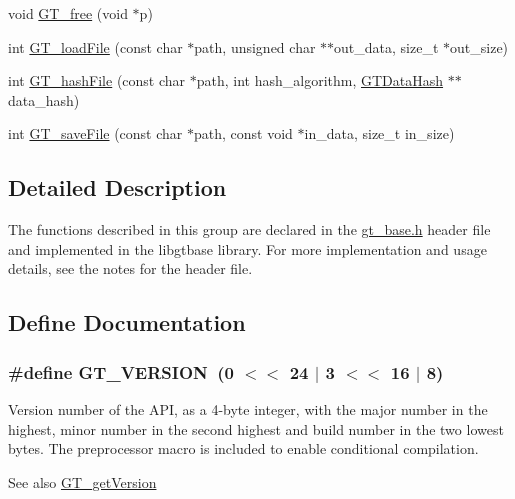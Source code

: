 \begin{DoxyCompactItemize}
\item 
void \hyperlink{group__common_ga0446e9253011a921665126e9f37016a1}{GT\_\-free} (void $\ast$p)
\item 
int \hyperlink{group__common_ga409dea240b5b501fa097de7c06705203}{GT\_\-loadFile} (const char $\ast$path, unsigned char $\ast$$\ast$out\_\-data, size\_\-t $\ast$out\_\-size)
\item 
int \hyperlink{group__common_ga3570d986dbe113cf94eca05ca7f68dfb}{GT\_\-hashFile} (const char $\ast$path, int hash\_\-algorithm, \hyperlink{struct_g_t_message_digest__st}{GTDataHash} $\ast$$\ast$data\_\-hash)
\item 
int \hyperlink{group__common_ga7837f369f5c83abadc08f6b55af31f30}{GT\_\-saveFile} (const char $\ast$path, const void $\ast$in\_\-data, size\_\-t in\_\-size)
\end{DoxyCompactItemize}


\subsection{Detailed Description}
The functions described in this group are declared in the {\ttfamily \hyperlink{gt__base_8h}{gt\_\-base.h}} header file and implemented in the {\ttfamily libgtbase} library. For more implementation and usage details, see the notes for the header file. 

\subsection{Define Documentation}
\hypertarget{group__common_gafdac78985a08fc5052b1d1f2888a25c9}{
\subsubsection[{GT\_\-VERSION}]{\setlength{\rightskip}{0pt plus 5cm}\#define GT\_\-VERSION~(0 $<$$<$ 24 $|$ 3 $<$$<$ 16 $|$ 8)}}
\label{group__common_gafdac78985a08fc5052b1d1f2888a25c9}
Version number of the API, as a 4-\/byte integer, with the major number in the highest, minor number in the second highest and build number in the two lowest bytes. The preprocessor macro is included to enable conditional compilation.

\begin{DoxySeeAlso}{See also}
\hyperlink{group__common_ga29f20e0dcc653a818552d01aa8b02369}{GT\_\-getVersion} 
\end{DoxySeeAlso}


